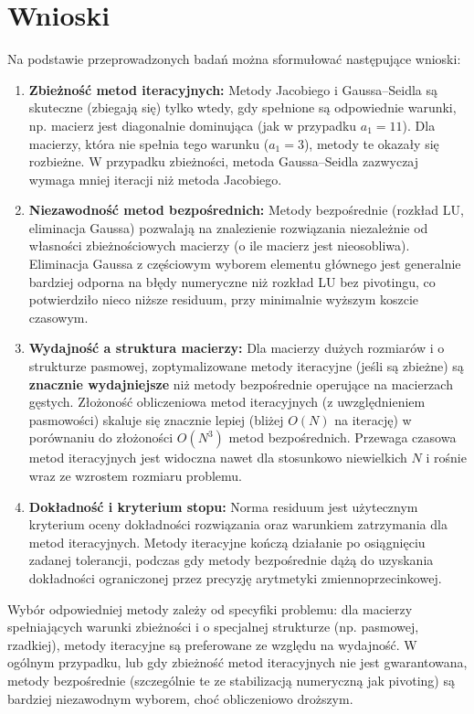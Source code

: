 \documentclass[a4paper, 11pt]{article}
\begin{document}
\section{Wnioski}
Na podstawie przeprowadzonych badań można sformułować następujące wnioski:
\begin{enumerate}
    \item \textbf{Zbieżność metod iteracyjnych:} Metody Jacobiego i Gaussa--Seidla są skuteczne (zbiegają się) tylko wtedy, gdy spełnione są odpowiednie warunki, np. macierz jest diagonalnie dominująca (jak w przypadku $a_1=11$). Dla macierzy, która nie spełnia tego warunku ($a_1=3$), metody te okazały się rozbieżne. W przypadku zbieżności, metoda Gaussa--Seidla zazwyczaj wymaga mniej iteracji niż metoda Jacobiego.
    \item \textbf{Niezawodność metod bezpośrednich:} Metody bezpośrednie (rozkład LU, eliminacja Gaussa) pozwalają na znalezienie rozwiązania niezależnie od własności zbieżnościowych macierzy (o ile macierz jest nieosobliwa). Eliminacja Gaussa z częściowym wyborem elementu głównego jest generalnie bardziej odporna na błędy numeryczne niż rozkład LU bez pivotingu, co potwierdziło nieco niższe residuum, przy minimalnie wyższym koszcie czasowym.
    \item \textbf{Wydajność a struktura macierzy:} Dla macierzy dużych rozmiarów i o strukturze pasmowej, zoptymalizowane metody iteracyjne (jeśli są zbieżne) są \textbf{znacznie wydajniejsze} niż metody bezpośrednie operujące na macierzach gęstych. Złożoność obliczeniowa metod iteracyjnych (z uwzględnieniem pasmowości) skaluje się znacznie lepiej (bliżej $O(N)$ na iterację) w porównaniu do złożoności $O(N^3)$ metod bezpośrednich. Przewaga czasowa metod iteracyjnych jest widoczna nawet dla stosunkowo niewielkich $N$ i rośnie wraz ze wzrostem rozmiaru problemu.
    \item \textbf{Dokładność i kryterium stopu:} Norma residuum jest użytecznym kryterium oceny dokładności rozwiązania oraz warunkiem zatrzymania dla metod iteracyjnych. Metody iteracyjne kończą działanie po osiągnięciu zadanej tolerancji, podczas gdy metody bezpośrednie dążą do uzyskania dokładności ograniczonej przez precyzję arytmetyki zmiennoprzecinkowej.
\end{enumerate}
Wybór odpowiedniej metody zależy od specyfiki problemu: dla macierzy spełniających warunki zbieżności i o specjalnej strukturze (np. pasmowej, rzadkiej), metody iteracyjne są preferowane ze względu na wydajność. W ogólnym przypadku, lub gdy zbieżność metod iteracyjnych nie jest gwarantowana, metody bezpośrednie (szczególnie te ze stabilizacją numeryczną jak pivoting) są bardziej niezawodnym wyborem, choć obliczeniowo droższym.
\end{document}
